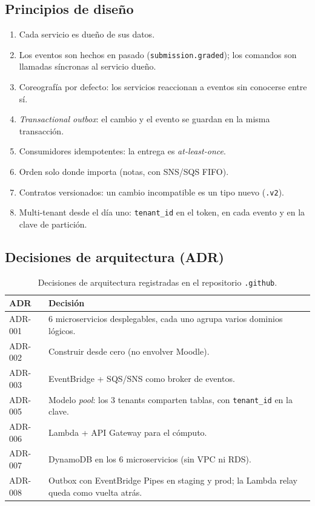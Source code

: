\subsection{Principios de diseño}
\begin{enumerate}
  \item Cada servicio es dueño de sus datos.
  \item Los eventos son hechos en pasado (\texttt{submission.graded}); los comandos son llamadas
        síncronas al servicio dueño.
  \item Coreografía por defecto: los servicios reaccionan a eventos sin conocerse entre sí.
  \item \textit{Transactional outbox}: el cambio y el evento se guardan en la misma transacción.
  \item Consumidores idempotentes: la entrega es \textit{at-least-once}.
  \item Orden solo donde importa (notas, con SNS/SQS FIFO).
  \item Contratos versionados: un cambio incompatible es un tipo nuevo (\texttt{.v2}).
  \item Multi-tenant desde el día uno: \texttt{tenant\_id} en el token, en cada evento y en la clave
        de partición.
\end{enumerate}

\subsection{Decisiones de arquitectura (ADR)}
\begin{table}[htbp]
\centering\small
\begin{tabularx}{\textwidth}{lX}
\toprule
ADR & Decisión \\
\midrule
ADR-001 & 6 microservicios desplegables, cada uno agrupa varios dominios lógicos. \\
ADR-002 & Construir desde cero (no envolver Moodle). \\
ADR-003 & EventBridge + SQS/SNS como broker de eventos. \\
ADR-005 & Modelo \textit{pool}: los 3 tenants comparten tablas, con \texttt{tenant\_id} en la clave. \\
ADR-006 & Lambda + API Gateway para el cómputo. \\
ADR-007 & DynamoDB en los 6 microservicios (sin VPC ni RDS). \\
ADR-008 & Outbox con EventBridge Pipes en staging y prod; la Lambda relay queda como vuelta atrás. \\
\bottomrule
\end{tabularx}
\caption{Decisiones de arquitectura registradas en el repositorio \texttt{.github}.}
\label{tab:adr}
\end{table}
